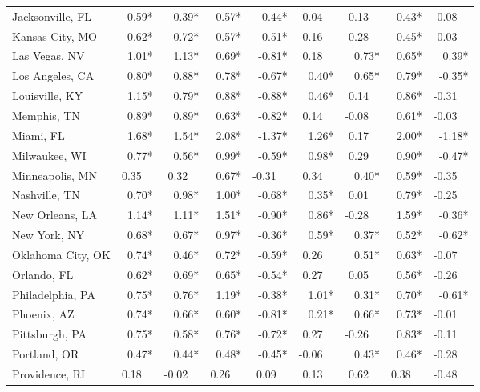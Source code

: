 \begin{tabular}{lrrrrrrrr}
	Jacksonville, FL   &  0.59* &   0.39* &   0.57* &  -0.44* &  0.04~~ & -0.13~~ &   0.43* & -0.08~~ \\
	Kansas City, MO    &  0.62* &   0.72* &   0.57* &  -0.51* &  0.16~~ &  0.28~~ &   0.45* & -0.03~~ \\
	Las Vegas, NV      &  1.01* &   1.13* &   0.69* &  -0.81* &  0.18~~ &   0.73* &   0.65* &   0.39* \\
	Los Angeles, CA    &  0.80* &   0.88* &   0.78* &  -0.67* &   0.40* &   0.65* &   0.79* &  -0.35* \\
	Louisville, KY     &  1.15* &   0.79* &   0.88* &  -0.88* &   0.46* &  0.14~~ &   0.86* & -0.31~~ \\
	Memphis, TN        &  0.89* &   0.89* &   0.63* &  -0.82* &  0.14~~ & -0.08~~ &   0.61* & -0.03~~ \\
	Miami, FL          &  1.68* &   1.54* &   2.08* &  -1.37* &   1.26* &  0.17~~ &   2.00* &  -1.18* \\
	Milwaukee, WI      &  0.77* &   0.56* &   0.99* &  -0.59* &   0.98* &  0.29~~ &   0.90* &  -0.47* \\
	Minneapolis, MN    & 0.35~~ &  0.32~~ &   0.67* & -0.31~~ &  0.34~~ &   0.40* &   0.59* & -0.35~~ \\
	Nashville, TN      &  0.70* &   0.98* &   1.00* &  -0.68* &   0.35* &  0.01~~ &   0.79* & -0.25~~ \\
	New Orleans, LA    &  1.14* &   1.11* &   1.51* &  -0.90* &   0.86* & -0.28~~ &   1.59* &  -0.36* \\
	New York, NY       &  0.68* &   0.67* &   0.97* &  -0.36* &   0.59* &   0.37* &   0.52* &  -0.62* \\
	Oklahoma City, OK  &  0.74* &   0.46* &   0.72* &  -0.59* &  0.26~~ &   0.51* &   0.63* & -0.07~~ \\
	Orlando, FL        &  0.62* &   0.69* &   0.65* &  -0.54* &  0.27~~ &  0.05~~ &   0.56* & -0.26~~ \\
	Philadelphia, PA   &  0.75* &   0.76* &   1.19* &  -0.38* &   1.01* &   0.31* &   0.70* &  -0.61* \\
	Phoenix, AZ        &  0.74* &   0.66* &   0.60* &  -0.81* &   0.21* &   0.66* &   0.73* & -0.01~~ \\
	Pittsburgh, PA     &  0.75* &   0.58* &   0.76* &  -0.72* &  0.27~~ & -0.26~~ &   0.83* & -0.11~~ \\
	Portland, OR       &  0.47* &   0.44* &   0.48* &  -0.45* & -0.06~~ &   0.43* &   0.46* & -0.28~~ \\
	Providence, RI     & 0.18~~ & -0.02~~ &  0.26~~ &  0.09~~ &  0.13~~ &  0.62~~ &  0.38~~ & -0.48~~ \\

\end{tabular}
